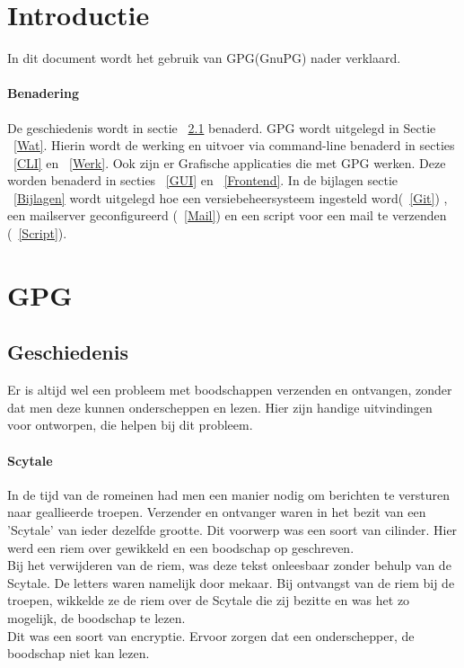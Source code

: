 \documentclass[12pt]{article}
\begin{document}
	\maketitle

	\newpage
	\tableofcontents
	\newpage
	\listoffigures
	\listoftables

	\newpage
		\section{Introductie}
			In dit document wordt het gebruik van GPG(GnuPG) nader verklaard.

		\paragraph{Benadering}
			De geschiedenis wordt in sectie ~\ref{Geschiedenis} benaderd.
			GPG wordt uitgelegd in Sectie ~\ref{Wat}.
			Hierin wordt de werking en uitvoer via command-line benaderd in secties ~\ref{CLI} en ~\ref{Werk}.
			Ook zijn er Grafische applicaties die met GPG werken. Deze worden benaderd in secties ~\ref{GUI} en ~\ref{Frontend}.
			In de bijlagen sectie ~\ref{Bijlagen} wordt uitgelegd hoe een versiebeheersysteem ingesteld word(~\ref{Git})
			, een mailserver geconfigureerd (~\ref{Mail}) en een script voor een mail te verzenden (~\ref{Script}).
			

		\newpage
		\section{GPG}\label{GPG}
			\subsection{Geschiedenis}\label{Geschiedenis}
				Er is altijd wel een probleem met boodschappen verzenden en ontvangen, zonder dat men deze kunnen onderscheppen en lezen. Hier zijn handige uitvindingen voor ontworpen, 								die helpen bij dit probleem.

			\paragraph{Scytale}
				In de tijd van de romeinen had men een manier nodig om berichten te versturen naar geallieerde troepen. Verzender en ontvanger waren in het bezit van een 												'Scytale' van ieder dezelfde grootte. Dit voorwerp was een soort van cilinder. Hier werd een riem over gewikkeld en een boodschap op geschreven.\\
				Bij het verwijderen van de riem, was deze tekst onleesbaar zonder behulp van de Scytale. De letters waren namelijk door mekaar. Bij ontvangst van de riem bij de 										troepen, wikkelde ze de riem over de Scytale die zij bezitte en was het zo mogelijk, de boodschap te lezen.\\
				Dit was een soort van encryptie. Ervoor zorgen dat een onderschepper, de boodschap niet kan lezen.
\end{document}
